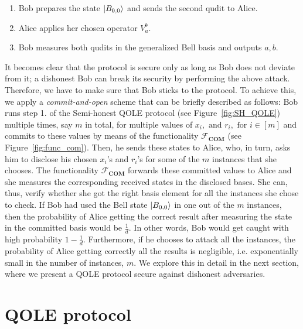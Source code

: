 \begin{enumerate}
    \item Bob prepares the state $| B_{0,0} \rangle$ and sends the second qudit to Alice.
    \item Alice applies her chosen operator $V^b_a$.
    \item Bob measures both qudits in the generalized Bell basis and outputs  $a,b$.
\end{enumerate}

It becomes clear that the protocol is secure only as long as Bob does not deviate from it; a dishonest Bob can break its security by performing the above attack. Therefore, we have to make sure that Bob sticks to the protocol. To achieve this, we apply a \textit{commit-and-open} scheme \cite{DFLSS09} that can be briefly described as follows:  Bob runs step 1. of the Semi-honest QOLE protocol (see Figure~\ref{fig:SH_QOLE}) multiple times, say $m$ in total, for multiple values of $x_i, \text{ and } r_i,\text{ for } i\in [m]$ and commits to these values by means of the functionality $\mathcal{F}_{\textbf{COM}}$ (see Figure~\ref{fig:func_com}). Then, he sends these states to Alice, who, in turn, asks him to disclose his chosen  $x_i$'s and $r_i$'s for some of the $m$ instances that she chooses. The functionality $\mathcal{F}_{\textbf{COM}}$ forwards these committed values to Alice and she measures the corresponding received states in the disclosed bases. She can, thus, verify whether she got the right basis element for all the instances she chose to check. If Bob had used the Bell state $| B_{0,0} \rangle$ in one out of the $m$ instances, then the probability of Alice getting the correct result after measuring the state in the committed basis would be $\frac{1}{d}$. In other words, Bob would get caught with high probability $1-\frac{1}{d}$. Furthermore, if he chooses to attack all the instances, the probability of Alice getting correctly all the results is negligible, i.e. exponentially small in the number of instances, $m$. We explore this in detail in the next section, where we present a  QOLE protocol secure against dishonest adversaries.

\section{QOLE protocol}\label{secureQROLE_overview}

